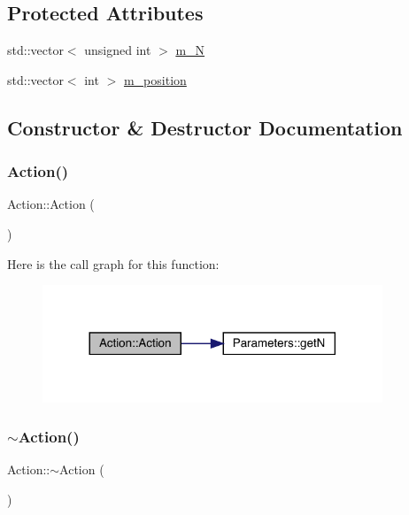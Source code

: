 \subsection*{Protected Attributes}
\begin{DoxyCompactItemize}
\item 
std\+::vector$<$ unsigned int $>$ \mbox{\hyperlink{class_action_a80654d2311707f24689cd9e480edb2f6}{m\+\_\+N}}
\item 
std\+::vector$<$ int $>$ \mbox{\hyperlink{class_action_a133fd17c83db233423855178bc81fb16}{m\+\_\+position}}
\end{DoxyCompactItemize}


\subsection{Constructor \& Destructor Documentation}
\mbox{\label{class_action_a4f457ccfc8336b565cadca56b36e0271}} 
\subsubsection{\texorpdfstring{Action()}{Action()}}
{\footnotesize\ttfamily Action\+::\+Action (\begin{DoxyParamCaption}{ }\end{DoxyParamCaption})}

Here is the call graph for this function\+:\nopagebreak
\begin{figure}[H]
\begin{center}
\leavevmode
\includegraphics[width=288pt]{class_action_a4f457ccfc8336b565cadca56b36e0271_cgraph}
\end{center}
\end{figure}
\mbox{\label{class_action_acdb06775d157339256a8ecd55749226c}} 
\subsubsection{\texorpdfstring{$\sim$Action()}{~Action()}}
{\footnotesize\ttfamily Action\+::$\sim$\+Action (\begin{DoxyParamCaption}{ }\end{DoxyParamCaption})\hspace{0.3cm}{\ttfamily [virtual]}}




